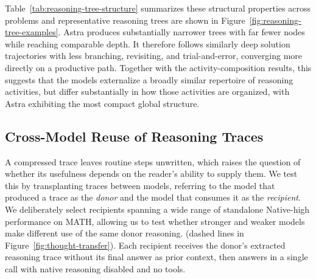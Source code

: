 \documentclass[10pt,letterpaper]{article}
\begin{document}
Table~\ref{tab:reasoning-tree-structure} summarizes these structural properties across problems and representative reasoning trees are shown in
Figure~\ref{fig:reasoning-tree-examples}. Astra produces substantially narrower trees with far fewer nodes while reaching comparable depth. It therefore follows similarly deep solution trajectories with less branching, revisiting, and trial-and-error, converging more directly on a productive path. Together with the activity-composition results, this suggests that the models
externalize a broadly similar repertoire of reasoning activities, but differ
substantially in how those activities are organized, with Astra exhibiting the
most compact global structure.







\subsection{Cross-Model Reuse of Reasoning Traces}
\label{sec:thought-transfer}

A compressed trace leaves routine steps unwritten, which raises the question of whether its usefulness depends on the reader's ability to supply them.  We test
this by transplanting traces between models, referring to the model that produced
a trace as the \emph{donor} and the model that consumes it as the
\emph{recipient}. We deliberately select recipients spanning a wide range of standalone Native-high performance on MATH, allowing us to test whether stronger and weaker models make different use of the same donor reasoning.  (dashed lines in Figure~\ref{fig:thought-transfer}). Each recipient receives the donor's extracted reasoning trace without its final answer as prior context, then answers in a single call with native reasoning disabled and no tools.
\end{document}
